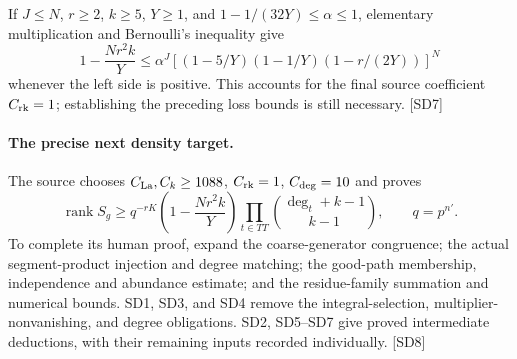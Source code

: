If $J\le N$, $r\ge2$, $k\ge5$, $Y\ge1$, and $1-1/(32Y)\le\alpha\le1$, elementary multiplication and Bernoulli's inequality give
\[
 1-\frac{Nr^2k}{Y}\le
 \alpha^J\left[(1-5/Y)(1-1/Y)(1-r/(2Y))\right]^N
\]
whenever the left side is positive. This accounts for the final source coefficient $C_{\rm rk}=1$; establishing the preceding loss bounds is still necessary. \textsf{[SD7]}

\paragraph{The precise next density target.}
The source chooses $C_{\rm La},C_k\ge1088$, $C_{\rm rk}=1$, $C_{\rm deg}=10$ and proves
\[
 \operatorname{rank}S_g\ge q^{-rK}
 \left(1-\frac{Nr^2k}{Y}\right)
 \prod_{t\in TT}\binom{\deg_t+k-1}{k-1},\qquad q=p^{n'}.
\]
To complete its human proof, expand the coarse-generator congruence; the actual segment-product injection and degree matching; the good-path membership, independence and abundance estimate; and the residue-family summation and numerical bounds. SD1, SD3, and SD4 remove the integral-selection, multiplier-nonvanishing, and degree obligations. SD2, SD5--SD7 give proved intermediate deductions, with their remaining inputs recorded individually. \textsf{[SD8]}
